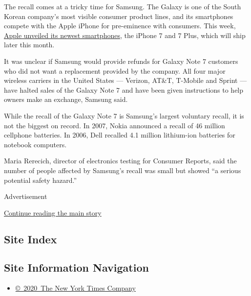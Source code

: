 The recall comes at a tricky time for Samsung. The Galaxy is one of the
South Korean company's most visible consumer product lines, and its
smartphones compete with the Apple iPhone for pre-eminence with
consumers. This week,
\href{http://www.nytimes3xbfgragh.onion/2016/09/08/technology/iphone-7-apple-headphone-jack.html?ref=technology}{Apple
unveiled its newest smartphones}, the iPhone 7 and 7 Plus, which will
ship later this month.

It was unclear if Samsung would provide refunds for Galaxy Note 7
customers who did not want a replacement provided by the company. All
four major wireless carriers in the United States --- Verizon, AT\&T,
T-Mobile and Sprint --- have halted sales of the Galaxy Note 7 and have
been given instructions to help owners make an exchange, Samsung said.

While the recall of the Galaxy Note 7 is Samsung's largest voluntary
recall, it is not the biggest on record. In 2007, Nokia announced a
recall of 46 million cellphone batteries. In 2006, Dell recalled 4.1
million lithium-ion batteries for notebook computers.

Maria Rerecich, director of electronics testing for Consumer Reports,
said the number of people affected by Samsung's recall was small but
showed ``a serious potential safety hazard.''

Advertisement

\protect\hyperlink{after-bottom}{Continue reading the main story}

\hypertarget{site-index}{%
\subsection{Site Index}\label{site-index}}

\hypertarget{site-information-navigation}{%
\subsection{Site Information
Navigation}\label{site-information-navigation}}

\begin{itemize}
\tightlist
\item
  \href{https://help.nytimes3xbfgragh.onion/hc/en-us/articles/115014792127-Copyright-notice}{©~2020~The
  New York Times Company}
\end{itemize}

